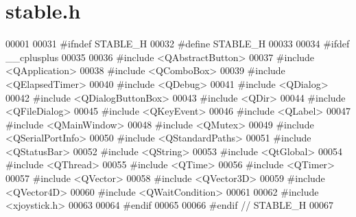 \hypertarget{a00025_source}{}\section{stable.\+h}

\begin{DoxyCode}
00001 
00031 \textcolor{preprocessor}{#ifndef STABLE\_H}
00032 \textcolor{preprocessor}{#define STABLE\_H}
00033 
00034 \textcolor{preprocessor}{#ifdef \_\_cplusplus}
00035 
00036 \textcolor{preprocessor}{#include <QAbstractButton>}
00037 \textcolor{preprocessor}{#include <QApplication>}
00038 \textcolor{preprocessor}{#include <QComboBox>}
00039 \textcolor{preprocessor}{#include <QElapsedTimer>}
00040 \textcolor{preprocessor}{#include <QDebug>}
00041 \textcolor{preprocessor}{#include <QDialog>}
00042 \textcolor{preprocessor}{#include <QDialogButtonBox>}
00043 \textcolor{preprocessor}{#include <QDir>}
00044 \textcolor{preprocessor}{#include <QFileDialog>}
00045 \textcolor{preprocessor}{#include <QKeyEvent>}
00046 \textcolor{preprocessor}{#include <QLabel>}
00047 \textcolor{preprocessor}{#include <QMainWindow>}
00048 \textcolor{preprocessor}{#include <QMutex>}
00049 \textcolor{preprocessor}{#include <QSerialPortInfo>}
00050 \textcolor{preprocessor}{#include <QStandardPaths>}
00051 \textcolor{preprocessor}{#include <QStatusBar>}
00052 \textcolor{preprocessor}{#include <QString>}
00053 \textcolor{preprocessor}{#include <QtGlobal>}
00054 \textcolor{preprocessor}{#include <QThread>}
00055 \textcolor{preprocessor}{#include <QTime>}
00056 \textcolor{preprocessor}{#include <QTimer>}
00057 \textcolor{preprocessor}{#include <QVector>}
00058 \textcolor{preprocessor}{#include <QVector3D>}
00059 \textcolor{preprocessor}{#include <QVector4D>}
00060 \textcolor{preprocessor}{#include <QWaitCondition>}
00061 
00062 \textcolor{preprocessor}{#include <xjoystick.h>}
00063 
00064 \textcolor{preprocessor}{#endif}
00065 
00066 \textcolor{preprocessor}{#endif // STABLE\_H}
00067 
\end{DoxyCode}
